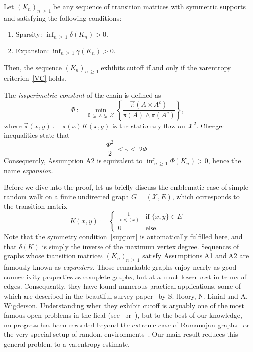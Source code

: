 \documentclass[AHL,Unicode,longabstracts,published]{cedram}
\newcommand{\cX}{\mathcal{X}}
\newcommand*{\Aenumi}{\renewcommand*{\theenumi}{A\arabic{enumi}}}
\begin{document}
\begin{theo}\label{th:main}
Let $(K_n)_{n\,\ge\,1}$ be any sequence of transition matrices with symmetric supports and satisfying the following conditions:
\begin{enumerate}\Aenumi
\item\label{A1} Sparsity: $\inf_{n\,\ge\,1}\delta(K_n)>0$.
\item\label{A2} Expansion: $\inf_{n\,\ge\,1}\gamma(K_n)>0$.
\end{enumerate}
Then, the sequence $(K_n)_{n\,\ge\,1}$ exhibits cutoff if and only if the varentropy criterion~\eqref{VC} holds.
\end{theo}

\begin{rema} The \emph{isoperimetric constant} of the chain is defined as
\[
\Phi := \min_{\emptyset\,\subsetneq\,A\,\subsetneq\,\cX }\left\{\frac{\vec{\pi}(A\times A^c)}{\pi(A)\wedge \pi(A^c)}\right\},
\]
where $\vec{\pi}(x,y):=\pi(x)K(x,y)$ is the stationary flow on $\cX^2$. Cheeger inequalities state that
\[
\frac{\Phi^2}{2} \ \le \gamma \le \ 2\Phi.
\]
Consequently, Assumption A2 is equivalent to $\inf_{n\,\ge\,1}\Phi(K_n)>0$, hence the name \emph{expansion}.
\end{rema}

Before we dive into the proof, let us briefly discuss the emblematic case of simple random walk on a finite undirected graph $G=(\cX,E)$, which corresponds to the transition matrix
\begin{equation*}
K(x,y) := 
\begin{cases}
\frac{1}{\deg(x)} & \text{if }\{x,y\}\in E\\
0 & \text{else}.
\end{cases}
\end{equation*}
Note that the symmetry condition~\eqref{support} is automatically fulfilled here, and that $\delta(K)$ is simply the inverse of the maximum vertex degree. Sequences of graphs whose transition matrices $(K_n)_{n\,\ge\,1}$ satisfy Assumptions A1 and A2 are famously known as \emph{expanders}. Those remarkable graphs enjoy nearly as good connectivity properties as complete graphs, but at a much lower cost in terms of edges. Consequently, they have found numerous practical applications, some of which are described in the beautiful survey paper~\cite{MR2247919} by S. Hoory, N. Linial and A. Wigderson. Understanding when they exhibit cutoff is arguably one of the most famous open problems in the field (see~\cite[Open Question~34]{peresamerican} or~\cite[Question~5]{MR3726904}), but to the best of our knowledge, no progress has been recorded beyond the extreme case of {Ramanujan graphs}~\cite{MR4476123,MR3693771,MR3558308,MR4178418} or the very special setup of random environments~\cite{MR3773804,MR3916108,MR3650414,MR4132638,MR3758735,
MR4476123,
arxiv.2212.04469,MR4385126,MR2667423}. Our main result reduces this general problem to a varentropy estimate.
\end{document}
